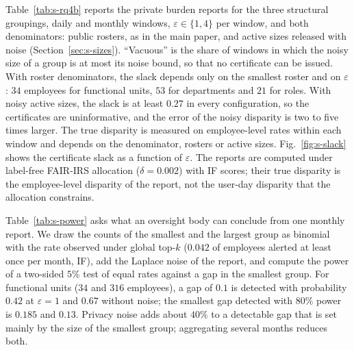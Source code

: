 \documentclass[10pt,onecolumn,letterpaper]{article}
\begin{document}
Table~\ref{tab:s-rq4b} reports the private burden reports for the three structural groupings, daily and monthly windows, $\varepsilon\in\{1,4\}$ per window, and both denominators: public rosters, as in the main paper, and active sizes released with noise (Section~\ref{sec:s-sizes}). ``Vacuous'' is the share of windows in which the noisy size of a group is at most its noise bound, so that no certificate can be issued. With roster denominators, the slack depends only on the smallest roster and on $\varepsilon$: $34$ employees for functional units, $53$ for departments and $21$ for roles. With noisy active sizes, the slack is at least $0.27$ in every configuration, so the certificates are uninformative, and the error of the noisy disparity is two to five times larger. The true disparity is measured on employee-level rates within each window and depends on the denominator, rosters or active sizes. Fig.~\ref{fig:s-slack} shows the certificate slack as a function of $\varepsilon$. The reports are computed under label-free FAIR-IRS allocation ($\delta=0.002$) with IF scores; their true disparity is the employee-level disparity of the report, not the user-day disparity that the allocation constrains.

Table~\ref{tab:s-power} asks what an oversight body can conclude from one monthly report. We draw the counts of the smallest and the largest group as binomial with the rate observed under global top-$k$ ($0.042$ of employees alerted at least once per month, IF), add the Laplace noise of the report, and compute the power of a two-sided $5\%$ test of equal rates against a gap in the smallest group. For functional units ($34$ and $316$ employees), a gap of $0.1$ is detected with probability $0.42$ at $\varepsilon=1$ and $0.67$ without noise; the smallest gap detected with $80\%$ power is $0.185$ and $0.13$. Privacy noise adds about $40\%$ to a detectable gap that is set mainly by the size of the smallest group; aggregating several months reduces both.
\end{document}
